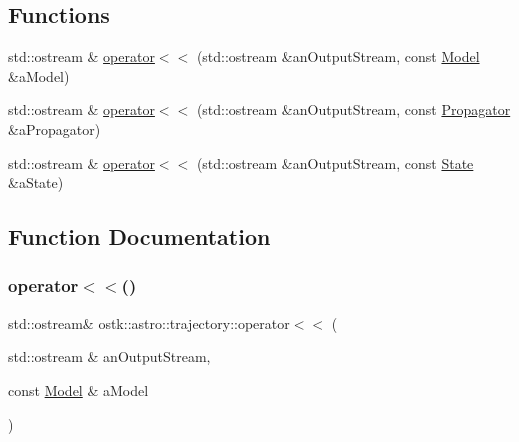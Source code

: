 \subsection*{Functions}
\begin{DoxyCompactItemize}
\item 
std\+::ostream \& \hyperlink{namespaceostk_1_1astro_1_1trajectory_af26a26e9fbf975e9b2a79b7f064ede6b}{operator$<$$<$} (std\+::ostream \&an\+Output\+Stream, const \hyperlink{classostk_1_1astro_1_1trajectory_1_1_model}{Model} \&a\+Model)
\item 
std\+::ostream \& \hyperlink{namespaceostk_1_1astro_1_1trajectory_a461afe0bd4dc6af7cd2623a8c6101856}{operator$<$$<$} (std\+::ostream \&an\+Output\+Stream, const \hyperlink{classostk_1_1astro_1_1trajectory_1_1_propagator}{Propagator} \&a\+Propagator)
\item 
std\+::ostream \& \hyperlink{namespaceostk_1_1astro_1_1trajectory_a995329a575cfbec97abc14f605cf5cfa}{operator$<$$<$} (std\+::ostream \&an\+Output\+Stream, const \hyperlink{classostk_1_1astro_1_1trajectory_1_1_state}{State} \&a\+State)
\end{DoxyCompactItemize}


\subsection{Function Documentation}
\mbox{\label{namespaceostk_1_1astro_1_1trajectory_af26a26e9fbf975e9b2a79b7f064ede6b}} 
\subsubsection{\texorpdfstring{operator$<$$<$()}{operator<<()}\hspace{0.1cm}{\footnotesize\ttfamily [1/3]}}
{\footnotesize\ttfamily std\+::ostream\& ostk\+::astro\+::trajectory\+::operator$<$$<$ (\begin{DoxyParamCaption}\item[{std\+::ostream \&}]{an\+Output\+Stream,  }\item[{const \hyperlink{classostk_1_1astro_1_1trajectory_1_1_model}{Model} \&}]{a\+Model }\end{DoxyParamCaption})}

\mbox{\label{namespaceostk_1_1astro_1_1trajectory_a461afe0bd4dc6af7cd2623a8c6101856}} 
